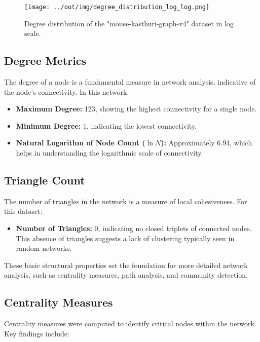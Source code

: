 \documentclass[
	report, %
	11pt, %
]{CSUniSchoolLabReport}
\begin{document}
\begin{figure}[h]
    \centering
	\texttt{[image: ../out/img/degree\_distribution\_log\_log.png]}
    \caption{Degree distribution of the "mouse-kasthuri-graph-v4" dataset in log scale.}
    \label{fig:deg_dist}
\end{figure}

\pagebreak

\subsection{Degree Metrics}

The degree of a node is a fundamental measure in network analysis, indicative of the node's connectivity. In this network:

\begin{itemize}
    \item \textbf{Maximum Degree:} 123, showing the highest connectivity for a single node.
    \item \textbf{Minimum Degree:} 1, indicating the lowest connectivity.
    \item \textbf{Natural Logarithm of Node Count (\(\ln N\)):} Approximately 6.94, which helps in understanding the logarithmic scale of connectivity.
\end{itemize}

\subsection{Triangle Count}

The number of triangles in the network is a measure of local cohesiveness. For this dataset:
\begin{itemize}
    \item \textbf{Number of Triangles:} 0, indicating no closed triplets of connected nodes. This absence of triangles suggests a lack of clustering typically seen in random networks.
\end{itemize}

These basic structural properties set the foundation for more detailed network analysis, such as centrality measures, path analysis, and community detection.


\subsection{Centrality Measures}

Centrality measures were computed to identify critical nodes within the network. Key findings include:
\end{document}
